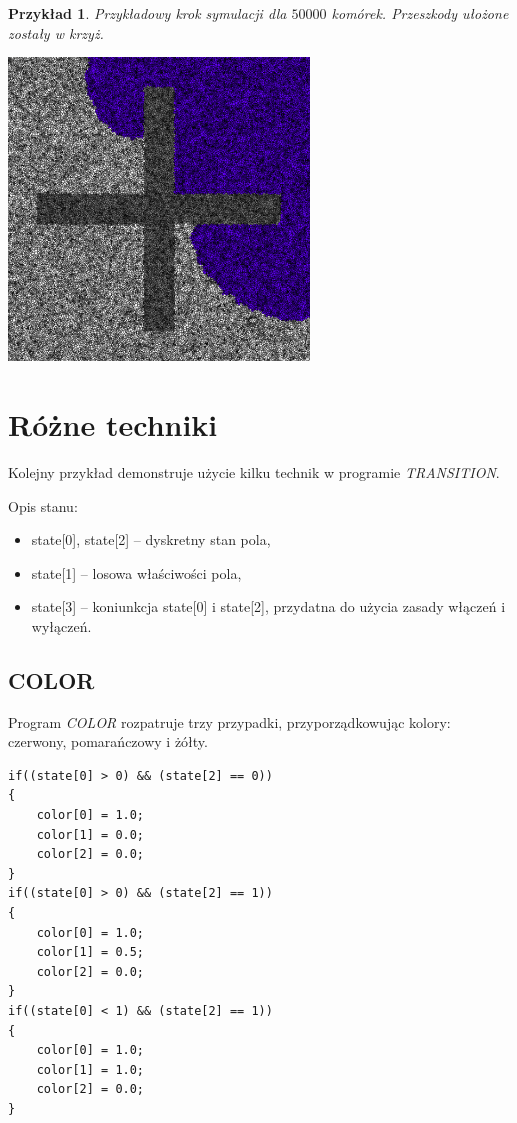 \documentclass[declaration,shortabstract, inz]{iithesis}
\theoremstyle{definition} \newtheorem{definition}{Definicja}[]
\theoremstyle{plain} \newtheorem{remark}[definition]{Obserwacja}
\theoremstyle{plain} \newtheorem{theorem}[definition]{Twierdzenie}
\theoremstyle{plain} \newtheorem{example}{Przykład}[definition]
\theoremstyle{plain} \newtheorem{lemma}[definition]{Lemat}
\begin{document}
\begin{example}
Przykładowy krok symulacji dla $50000$ komórek. Przeszkody ułożone zostały w krzyż.	
	
	\begin{center}
		\includegraphics[width=0.6\textwidth]{sim2}
	\end{center}
\end{example}

\section{Różne techniki}
Kolejny przykład demonstruje użycie kilku technik w programie \textit{TRANSITION}. 

Opis stanu:
\begin{itemize}
\item state[0], state[2] -- dyskretny stan pola,
\item state[1] -- losowa właściwości pola,
\item state[3] -- koniunkcja state[0] i state[2], przydatna do użycia zasady włączeń i wyłączeń.
\end{itemize}

\subsection{COLOR}
Program \textit{COLOR} rozpatruje trzy przypadki, przyporządkowując kolory: czerwony, pomarańczowy i żółty.

\begin{center}
\begin{lstlisting}
if((state[0] > 0) && (state[2] == 0))
{
    color[0] = 1.0;
    color[1] = 0.0;
    color[2] = 0.0;
}
if((state[0] > 0) && (state[2] == 1))
{
    color[0] = 1.0;
    color[1] = 0.5;
    color[2] = 0.0;
}
if((state[0] < 1) && (state[2] == 1))
{
    color[0] = 1.0;
    color[1] = 1.0;
    color[2] = 0.0;
}
\end{lstlisting}
\end{center}
\end{document}
